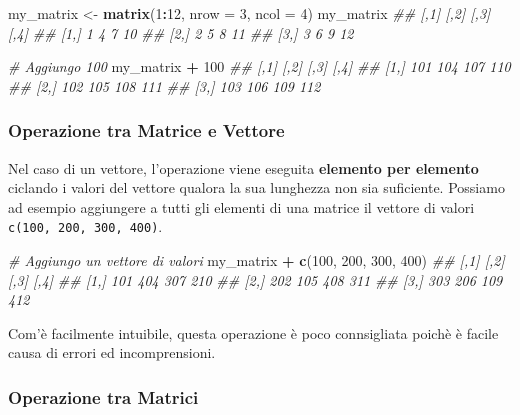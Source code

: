 \documentclass[
]{book}
\newenvironment{Shaded}{\begin{snugshade}}{\end{snugshade}}
\newcommand{\CommentTok}[1]{\textcolor[rgb]{0.56,0.35,0.01}{\textit{#1}}}
\newcommand{\DataTypeTok}[1]{\textcolor[rgb]{0.13,0.29,0.53}{#1}}
\newcommand{\DecValTok}[1]{\textcolor[rgb]{0.00,0.00,0.81}{#1}}
\newcommand{\KeywordTok}[1]{\textcolor[rgb]{0.13,0.29,0.53}{\textbf{#1}}}
\newcommand{\NormalTok}[1]{#1}
\newcommand{\OperatorTok}[1]{\textcolor[rgb]{0.81,0.36,0.00}{\textbf{#1}}}
\newcommand{\StringTok}[1]{\textcolor[rgb]{0.31,0.60,0.02}{#1}}
\begin{document}
\begin{Shaded}
\begin{Highlighting}[]
\NormalTok{my_matrix <-}\StringTok{ }\KeywordTok{matrix}\NormalTok{(}\DecValTok{1}\OperatorTok{:}\DecValTok{12}\NormalTok{, }\DataTypeTok{nrow =} \DecValTok{3}\NormalTok{, }\DataTypeTok{ncol =} \DecValTok{4}\NormalTok{)}
\NormalTok{my_matrix}
\CommentTok{##      [,1] [,2] [,3] [,4]}
\CommentTok{## [1,]    1    4    7   10}
\CommentTok{## [2,]    2    5    8   11}
\CommentTok{## [3,]    3    6    9   12}

\CommentTok{# Aggiungo 100}
\NormalTok{my_matrix }\OperatorTok{+}\StringTok{ }\DecValTok{100}
\CommentTok{##      [,1] [,2] [,3] [,4]}
\CommentTok{## [1,]  101  104  107  110}
\CommentTok{## [2,]  102  105  108  111}
\CommentTok{## [3,]  103  106  109  112}
\end{Highlighting}
\end{Shaded}

\hypertarget{operazione-tra-matrice-e-vettore}{%
\subsubsection*{Operazione tra Matrice e Vettore}\label{operazione-tra-matrice-e-vettore}}

Nel caso di un vettore, l'operazione viene eseguita \textbf{elemento per elemento} ciclando i valori del vettore qualora la sua lunghezza non sia suficiente. Possiamo ad esempio aggiungere a tutti gli elementi di una matrice il vettore di valori \texttt{c(100,\ 200,\ 300,\ 400)}.

\begin{Shaded}
\begin{Highlighting}[]
\CommentTok{# Aggiungo un vettore di valori}
\NormalTok{my_matrix }\OperatorTok{+}\StringTok{ }\KeywordTok{c}\NormalTok{(}\DecValTok{100}\NormalTok{, }\DecValTok{200}\NormalTok{, }\DecValTok{300}\NormalTok{, }\DecValTok{400}\NormalTok{)}
\CommentTok{##      [,1] [,2] [,3] [,4]}
\CommentTok{## [1,]  101  404  307  210}
\CommentTok{## [2,]  202  105  408  311}
\CommentTok{## [3,]  303  206  109  412}
\end{Highlighting}
\end{Shaded}

Com'è facilmente intuibile, questa operazione è poco connsigliata poichè è facile causa di errori ed incomprensioni.

\hypertarget{operazione-tra-matrici}{%
\subsubsection*{Operazione tra Matrici}\label{operazione-tra-matrici}}
\end{document}
